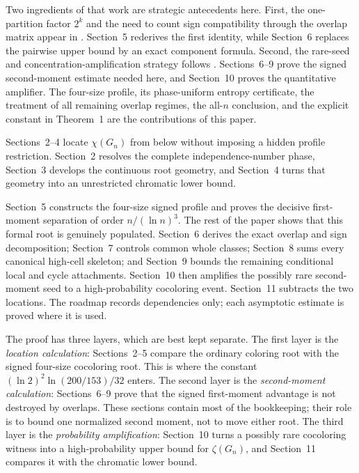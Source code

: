 \documentclass[11pt,reqno]{amsart}
\newcommand{\displayheading}[1]{%
  \par\addvspace{0.68\baselineskip}%
  \noindent{\scshape #1.}\par\nobreak\smallskip\noindent}
\begin{document}
Two ingredients of that work are strategic antecedents here.  First, the
one-partition factor \(2^k\) and the need to count sign compatibility through
the overlap matrix appear in
\citet[Proposition~6]{heckel-2025-difference}.  Section~5 rederives the first
identity, while Section~6 replaces the pairwise upper bound by an exact
component formula.  Second, the rare-seed and concentration-amplification
strategy follows \citet[Proposition~5 and the proof of
Theorem~1]{heckel-2025-difference}.  Sections~6--9 prove the signed
second-moment estimate needed here, and Section~10 proves the quantitative
amplifier.  The four-size profile, its phase-uniform entropy certificate,
the treatment of all remaining overlap regimes, the all-\(n\) conclusion,
and the explicit constant in Theorem~1 are the contributions of this paper.

\displayheading{Proof roadmap}
Sections~2--4 locate \(\chi(G_n)\) from below without imposing a hidden
profile restriction. Section~2 resolves the complete independence-number
phase, Section~3 develops the continuous root geometry, and Section~4 turns
that geometry into an unrestricted chromatic lower bound.

Section~5 constructs the four-size signed profile and proves the decisive
first-moment separation of order \(n/(\ln n)^3\). The rest of the paper shows
that this formal root is genuinely populated. Section~6 derives the exact
overlap and sign decomposition; Section~7 controls common whole classes;
Section~8 sums every canonical high-cell skeleton; and Section~9 bounds the
remaining conditional local and cycle attachments. Section~10 then amplifies
the possibly rare second-moment seed to a high-probability cocoloring event.
Section~11 subtracts the two locations. The roadmap records dependencies
only; each asymptotic estimate is proved where it is used.

\displayheading{How to read the proof}
The proof has three layers, which are best kept separate.  The first layer is
the \emph{location calculation}: Sections~2--5 compare the ordinary coloring
root with the signed four-size cocoloring root.  This is where the constant
\((\ln 2)^2\ln(200/153)/32\) enters.  The second layer is the
\emph{second-moment calculation}: Sections~6--9 prove that the signed
first-moment advantage is not destroyed by overlaps.  These sections contain
most of the bookkeeping; their role is to bound one normalized second moment,
not to move either root.  The third layer is the \emph{probability
amplification}: Section~10 turns a possibly rare cocoloring witness into a
high-probability upper bound for \(\zeta(G_n)\), and Section~11 compares it
with the chromatic lower bound.
\end{document}

